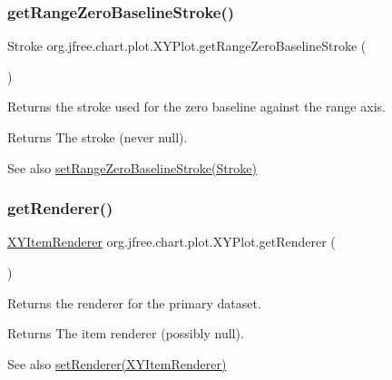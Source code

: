 \subsubsection{\texorpdfstring{get\+Range\+Zero\+Baseline\+Stroke()}{getRangeZeroBaselineStroke()}}
{\footnotesize\ttfamily Stroke org.\+jfree.\+chart.\+plot.\+X\+Y\+Plot.\+get\+Range\+Zero\+Baseline\+Stroke (\begin{DoxyParamCaption}{ }\end{DoxyParamCaption})}

Returns the stroke used for the zero baseline against the range axis.

\begin{DoxyReturn}{Returns}
The stroke (never {\ttfamily null}).
\end{DoxyReturn}
\begin{DoxySeeAlso}{See also}
\mbox{\hyperlink{classorg_1_1jfree_1_1chart_1_1plot_1_1_x_y_plot_ad6e0bfc216bd1280fac3de9cb311f13e}{set\+Range\+Zero\+Baseline\+Stroke(\+Stroke)}} 
\end{DoxySeeAlso}
\mbox{\label{classorg_1_1jfree_1_1chart_1_1plot_1_1_x_y_plot_adc261f128f1d00b8f474abc90075bf5d}} 
\subsubsection{\texorpdfstring{get\+Renderer()}{getRenderer()}\hspace{0.1cm}{\footnotesize\ttfamily [1/2]}}
{\footnotesize\ttfamily \mbox{\hyperlink{interfaceorg_1_1jfree_1_1chart_1_1renderer_1_1xy_1_1_x_y_item_renderer}{X\+Y\+Item\+Renderer}} org.\+jfree.\+chart.\+plot.\+X\+Y\+Plot.\+get\+Renderer (\begin{DoxyParamCaption}{ }\end{DoxyParamCaption})}

Returns the renderer for the primary dataset.

\begin{DoxyReturn}{Returns}
The item renderer (possibly {\ttfamily null}).
\end{DoxyReturn}
\begin{DoxySeeAlso}{See also}
\mbox{\hyperlink{classorg_1_1jfree_1_1chart_1_1plot_1_1_x_y_plot_a7fd7dcb961248486bac19441a2e95eb7}{set\+Renderer(\+X\+Y\+Item\+Renderer)}} 
\end{DoxySeeAlso}
\mbox{\label{classorg_1_1jfree_1_1chart_1_1plot_1_1_x_y_plot_a53b99134a5298b4aad9e602210a54896}} 
